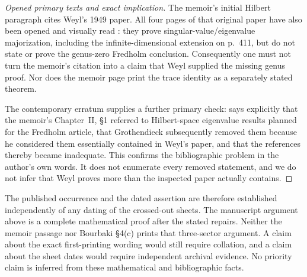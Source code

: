 \begin{proof}[Opened primary texts and exact implication]
The memoir's initial Hilbert paragraph cites Weyl's 1949 paper.
All four pages of that original paper
have also been opened and visually read \cite{Weyl1949}: they prove
singular-value/eigenvalue majorization, including the infinite-dimensional
extension on p.~411, but do not state or prove the genus-zero Fredholm
conclusion. Consequently one must not turn the memoir's citation into a
claim that Weyl supplied the missing genus proof. Nor does the memoir page
print the trace identity as a separately stated theorem.

The contemporary erratum supplies a further primary check:
\cite[p.~119]{Grothendieck1956Erratum} says explicitly that the memoir's
Chapter~II, \S1 referred to Hilbert-space eigenvalue results planned for the
Fredholm article, that Grothendieck subsequently removed them because he
considered them essentially contained in Weyl's paper, and that the
references thereby became inadequate. This confirms the bibliographic
problem in the author's own words. It does not enumerate every removed
statement, and we do not infer that Weyl proves more than the inspected
paper actually contains.
\end{proof}

The published occurrence and the dated assertion are therefore established
independently of any dating of the crossed-out sheets. The manuscript
argument above is a complete mathematical proof after the stated repairs.
Neither the memoir passage nor Bourbaki \S4(c) prints that three-sector
argument. A claim about the exact first-printing wording would still
require collation, and a claim about the sheet dates would require
independent archival evidence. No priority claim is inferred from these
mathematical and bibliographic facts.
